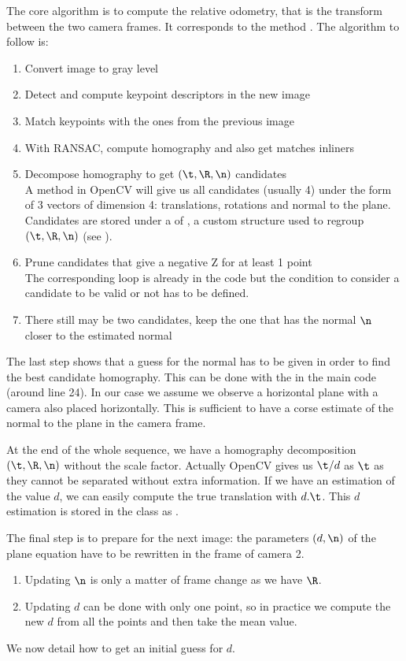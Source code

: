 \documentclass{ecnreport}
\begin{document}
The core algorithm is to compute the relative odometry, that is the transform between the two camera frames. It corresponds to the method .
The algorithm to follow is:
\begin{enumerate}
  \item Convert image to gray level
 \item Detect and compute keypoint descriptors in the new image
 \item Match keypoints with the ones from the previous image
 \item With RANSAC, compute homography and also get matches inliners 
 \item Decompose homography to get $(\t,\R,\n)$ candidates\\
  A method in OpenCV
will give us all candidates (usually 4) under the form of 3 vectors of dimension 4: translations, rotations and normal to the plane. Candidates 
are stored under a  of , a custom structure used to regroup $(\t,\R,\n)$ (see ).
 \item Prune candidates that give a negative Z for at least 1 point \\ The corresponding loop is already in the code but the condition to consider a candidate to be valid or not has to be defined.
 \item There still may be two candidates, keep the one that has the normal $\n$ closer to the estimated normal
\end{enumerate}
The last step shows that a guess for the normal has to be given in order to find the best candidate homography. This can be done with the  in the main code (around line 24). In our case we assume
we observe a horizontal plane with a camera also placed horizontally. This is sufficient to have a corse estimate of the normal to the plane in the camera frame.

At the end of the whole sequence, we have a homography decomposition $(\t,\R,\n)$ without the scale factor. Actually OpenCV gives us $\t/d$ as $\t$ as they cannot be separated without
extra information. If we have an estimation of the value $d$, we can easily compute the true translation with $d.\t$. This $d$ estimation is stored in the  class as .

The final step is to prepare for the next image: the parameters $(d,\n)$ of the plane equation have to be rewritten in the frame of camera 2.
\begin{enumerate}
 \item Updating $\n$ is only a matter of frame change as we have $\R$.
 \item Updating $d$ can be done with only one point, so in practice we compute the new $d$ from all the points and then take the mean value.
\end{enumerate}
We now detail how to get an initial guess for $d$.
\end{document}
